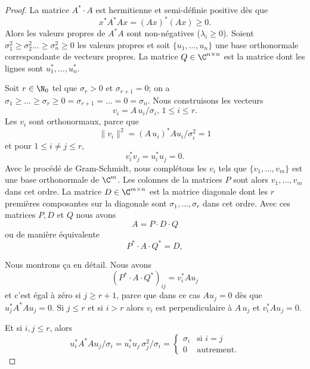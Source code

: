 \begin{proof}
  La matrice $A^* \cdot  A$ est hermitienne et semi-définie positive dès que
  \begin{displaymath}
    x^*A^*Ax = (Ax)^* (Ax) \geq 0. 
  \end{displaymath}
Alors les valeurs propres de $A^*A$ sont non-négatives ($\lambda_i\geq 0$). Soient $\sigma_1^2 \geq \sigma_2^2 \dots \geq \sigma_n^2\geq 0$ les valeurs propres et soit $\{u_1,\dots,u_n\}$ une base orthonormale  correspondante de vecteurs propres. La matrice $Q \in \C^{n \times n}$ est la matrice dont les lignes sont $u_1^*, \dots, u_n^*$. 

Soit $ r \in \N_0$ tel que $\sigma_r >0$ et $\sigma_{r+1} = 0$; on a $\sigma_1 \geq \ldots \geq \sigma_r \geq 0=\sigma_{r+1} = \ldots = 0=\sigma_n  $. Nous construisons les vecteurs 
\begin{displaymath}
  v_i = A \, u_i  / \sigma_i, \, 1 \leq i \leq r. 
\end{displaymath}
Les $v_i$ sont orthonormaux, parce que 
\begin{displaymath}
  \|v_i\|^2 = (A \, u_i)^* A u_i / \sigma_i^2 = 1
\end{displaymath}
et pour $1 \leq i\neq j \leq r$, 
\begin{displaymath}
  v_i^* v_j = u_i^* u_j = 0. 
\end{displaymath}
Avec le procédé de Gram-Schmidt, nous complétons les $v_i$ tels que $\{v_1,\dots,v_m\}$ est une base orthonormale de $\C^m$. Les colonnes de la matrices $P$ sont alors $v_1,\dots,v_m$ dans cet ordre. La matrice $D \in \C^{m\times n}$ est la matrice diagonale dont les $r$ premières composantes sur la diagonale sont $\sigma_1,\dots,\sigma_r$ dans cet ordre. Avec ces matrices  $P,D$ et $Q$ nous avons 
\begin{displaymath}
  A = P\cdot D \cdot Q 
\end{displaymath}
ou de manière équivalente 
\begin{displaymath}
  P^* \cdot A \cdot Q^* = D,
\end{displaymath}

Nous montrons  ça en détail. Nous avons 
\begin{displaymath}
   (P^* \cdot A \cdot Q^*)_{ij} = v_i^* A u_j 
\end{displaymath}
et c'est égal à zéro si $j \geq r+1$, parce que dans ce cas $A u_j =0$ dès que $u_j^*A^*Au_j = 0$. 
Si $j \leq r$  et si $i>r$ alors $v_i$ est perpendiculaire à $A\, u_j$ et  $v_i^*Au_j = 0$. 

Et  si $i,j \leq r$, alors 
\begin{displaymath}
  u_i^* A^* A u_j / \sigma_i = u_i^* u_j \,  \sigma_j^2 / \sigma_i=
  \begin{cases}
    \sigma_i & \text{si } i=j\\
    0 & \text{autrement}.  
  \end{cases}
\end{displaymath}
\end{proof}


